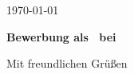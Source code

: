 \documentclass[a4paper, 12pt]{article}
\begin{document}
\begin{minipage}[t]{0.28\textwidth}
  
\end{minipage}
\hfill
\begin{minipage}[t]{0.65\textwidth}
\vspace{0pt}

\hfill \today

\vspace{0.8cm}

\textbf{Bewerbung als \JobTitle\ bei \Company}

\vspace{0.4cm}

\Salutation

\vspace{0.4cm}

\JobContent

\vspace{0.8cm}

Mit freundlichen Grüßen \\[1cm]
\Name

\end{minipage}
\end{document}
